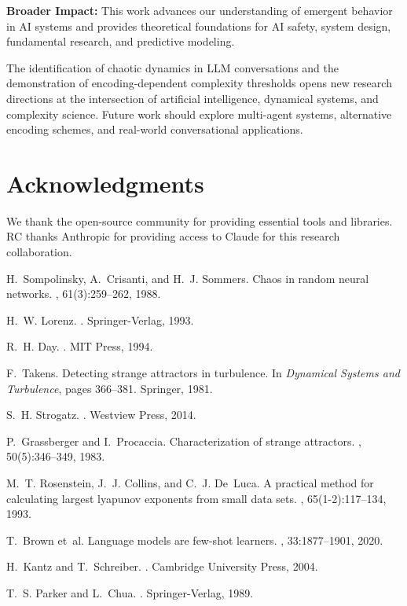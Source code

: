 \documentclass[11pt,a4paper]{article}
\begin{document}
\textbf{Broader Impact:}
This work advances our understanding of emergent behavior in AI systems and provides theoretical foundations for AI safety, system design, fundamental research, and predictive modeling.

The identification of chaotic dynamics in LLM conversations and the demonstration of encoding-dependent complexity thresholds opens new research directions at the intersection of artificial intelligence, dynamical systems, and complexity science. Future work should explore multi-agent systems, alternative encoding schemes, and real-world conversational applications.

\section*{Acknowledgments}

We thank the open-source community for providing essential tools and libraries. RC thanks Anthropic for providing access to Claude for this research collaboration.


\begin{thebibliography}{10}

H.~Sompolinsky, A.~Crisanti, and H.~J. Sommers.
\newblock Chaos in random neural networks.
, 61(3):259--262, 1988.

H.~W. Lorenz.
.
\newblock Springer-Verlag, 1993.

R.~H. Day.
.
\newblock MIT Press, 1994.

F.~Takens.
\newblock Detecting strange attractors in turbulence.
\newblock In {\em Dynamical Systems and Turbulence}, pages 366--381. Springer, 1981.

S.~H. Strogatz.
.
\newblock Westview Press, 2014.

P.~Grassberger and I.~Procaccia.
\newblock Characterization of strange attractors.
, 50(5):346--349, 1983.

M.~T. Rosenstein, J.~J. Collins, and C.~J. De~Luca.
\newblock A practical method for calculating largest lyapunov exponents from small data sets.
, 65(1-2):117--134, 1993.

T.~Brown et~al.
\newblock Language models are few-shot learners.
, 33:1877--1901, 2020.

H.~Kantz and T.~Schreiber.
.
\newblock Cambridge University Press, 2004.

T.~S. Parker and L.~Chua.
.
\newblock Springer-Verlag, 1989.

\end{thebibliography}
\end{document}

